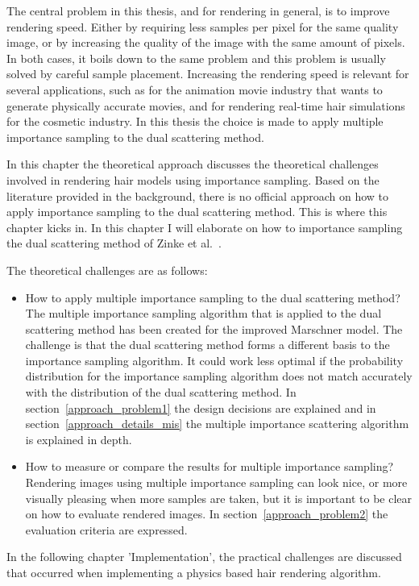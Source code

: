 \documentclass[11pt,a4paper]{report}
\begin{document}
The central problem in this thesis, and for rendering in general, is to improve rendering speed. Either by requiring less samples per pixel for the same quality image, or by increasing the quality of the image with the same amount of pixels. In both cases, it boils down to the same problem and this problem is usually solved by careful sample placement. Increasing the rendering speed is relevant for several applications, such as for the animation movie industry that wants to generate physically accurate movies, and for rendering real-time hair simulations for the cosmetic industry. In this thesis the choice is made to apply multiple importance sampling to the dual scattering method.

In this chapter the theoretical approach discusses the theoretical challenges involved in rendering hair models using importance sampling. Based on the literature provided in the background, there is no official approach on how to apply importance sampling to the dual scattering method. This is where this chapter kicks in. In this chapter I will elaborate on how to importance sampling the dual scattering method of Zinke et al.~\cite{zinke}.

The theoretical challenges are as follows:

\begin{itemize}
    \item How to apply multiple importance sampling to the dual scattering method? The multiple importance sampling algorithm that is applied to the dual scattering method has been created for the improved Marschner model. The challenge is that the dual scattering method forms a different basis to the importance sampling algorithm. It could work less optimal if the probability distribution for the importance sampling algorithm does not match accurately with the distribution of the dual scattering method. In section~\ref{approach_problem1} the design decisions are explained and in section~\ref{approach_details_mis} the multiple importance scattering algorithm is explained in depth.
    \item How to measure or compare the results for multiple importance sampling? Rendering images using multiple importance sampling can look nice, or more visually pleasing when more samples are taken, but it is important to be clear on how to evaluate rendered images. In section~\ref{approach_problem2} the evaluation criteria are expressed.
\end{itemize}

In the following chapter 'Implementation', the practical challenges are discussed that occurred when implementing a physics based hair rendering algorithm.
\end{document}
